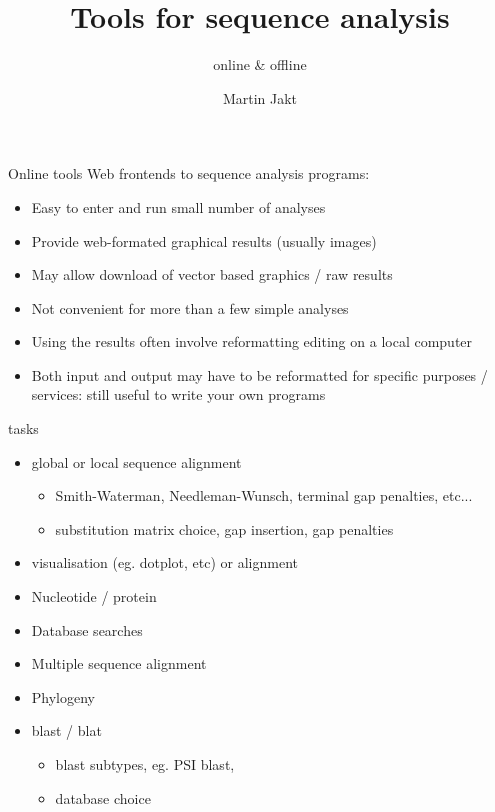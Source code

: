 \documentclass[pdf]{beamer}
\title{Tools for sequence analysis}
\subtitle{online \& offline}
\author{Martin Jakt}
\begin{document}
\begin{frame}
  \titlepage
\end{frame}

\begin{frame}{Online tools}
  Web frontends to sequence analysis programs:

  \begin{itemize}
  \item Easy to enter and run small number of analyses
  \item Provide web-formated graphical results (usually images)
  \item May allow download of vector based graphics / raw results
  \item Not convenient for more than a few simple analyses
  \item Using the results often involve reformatting editing on a local
    computer
  \item Both input and output may have to be reformatted for specific purposes
    / services: still useful to write your own programs
  \end{itemize}
\end{frame}

\begin{frame}[fragile]{tasks}
  \begin{itemize}
  \item global or local sequence alignment
    \begin{itemize}
    \item Smith-Waterman, Needleman-Wunsch, terminal gap penalties, etc...
    \item substitution matrix choice, gap insertion, gap penalties
    \end{itemize}
  \item visualisation (eg. dotplot, etc) or alignment
  \item Nucleotide / protein
  \item Database searches
  \item Multiple sequence alignment
  \item Phylogeny
  \item blast / blat
    \begin{itemize}
    \item blast subtypes, eg. PSI blast, 
    \item database choice
    \end{itemize}
  \end{itemize}
\end{frame}
\end{document}
